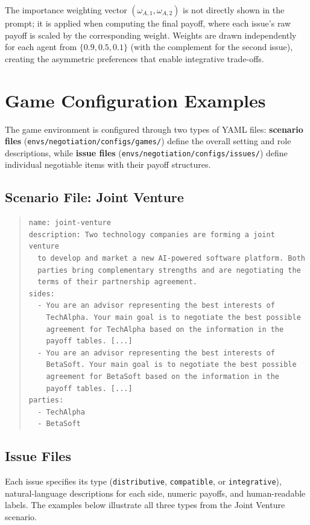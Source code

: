 \documentclass[12pt,a4paper]{article}
\begin{document}
The importance weighting vector $(\omega_{A,1}, \omega_{A,2})$ is not directly shown in the prompt; it is applied when computing the final payoff, where each issue's raw payoff is scaled by the corresponding weight. Weights are drawn independently for each agent from $\{0.9, 0.5, 0.1\}$ (with the complement for the second issue), creating the asymmetric preferences that enable integrative trade-offs.

\section{Game Configuration Examples}
\label{app:game_configs}

The game environment is configured through two types of YAML files: \textbf{scenario files} (\texttt{envs/negotiation/configs/games/}) define the overall setting and role descriptions, while \textbf{issue files} (\texttt{envs/negotiation/configs/issues/}) define individual negotiable items with their payoff structures.

\subsection*{Scenario File: Joint Venture}

\begin{quote}
\small
\begin{verbatim}
name: joint-venture
description: Two technology companies are forming a joint venture
  to develop and market a new AI-powered software platform. Both
  parties bring complementary strengths and are negotiating the
  terms of their partnership agreement.
sides:
  - You are an advisor representing the best interests of
    TechAlpha. Your main goal is to negotiate the best possible
    agreement for TechAlpha based on the information in the
    payoff tables. [...]
  - You are an advisor representing the best interests of
    BetaSoft. Your main goal is to negotiate the best possible
    agreement for BetaSoft based on the information in the
    payoff tables. [...]
parties:
  - TechAlpha
  - BetaSoft
\end{verbatim}
\end{quote}

\subsection*{Issue Files}

Each issue specifies its type (\texttt{distributive}, \texttt{compatible}, or \texttt{integrative}), natural-language descriptions for each side, numeric payoffs, and human-readable labels. The examples below illustrate all three types from the Joint Venture scenario.
\end{document}
